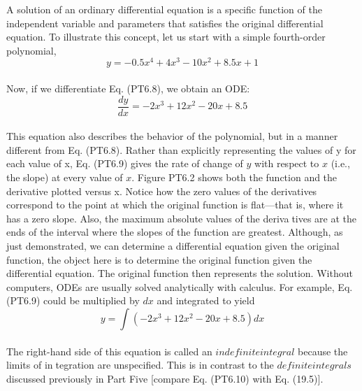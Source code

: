 A solution of an ordinary differential equation is a specific function of the independent
variable and parameters that satisfies the original differential equation. To illustrate this
concept, let us start with a simple fourth-order polynomial,\\
\begin{equation}
\tag{PT6.8}
y=-0.5x^4 + 4x^3 - 10x^2 + 8.5x + 1
\end{equation}\\
Now, if we differentiate Eq. (PT6.8), we obtain an ODE:
\begin{equation}
\tag{PT6.9}
\dfrac{dy}{dx} = -2x^3 + 12x^2 - 20x + 8.5
\end{equation}\\
This equation also describes the behavior of the polynomial, but in a manner different from
Eq. (PT6.8). Rather than explicitly representing the values of y for each value of x,
Eq. (PT6.9) gives the rate of change of $y$ with respect to $x$ (i.e., the slope) at every value of
$x$. Figure PT6.2 shows both the function and the derivative plotted versus x. Notice how the
zero values of the derivatives correspond to the point at which the original function is
flat—that is, where it has a zero slope. Also, the maximum absolute values of the derivatives are at the ends of the interval where the slopes of the function are greatest.
Although, as just demonstrated, we can determine a differential equation given the
original function, the object here is to determine the original function given the differential
equation. The original function then represents the solution. 
Without computers, ODEs are usually solved analytically with calculus. For example,
Eq. (PT6.9) could be multiplied by $dx$ and integrated to yield\\
\begin{equation}
\tag{PT6.10}
y= \int(-2x^3 + 12x^2 - 20x + 8.5)dx
\end{equation}\\
The right-hand side of this equation is called an $indefinite integral$ because the limits of integration are unspecified. This is in contrast to the $definite integrals$ discussed previously
in Part Five [compare Eq. (PT6.10) with Eq. (19.5)].

